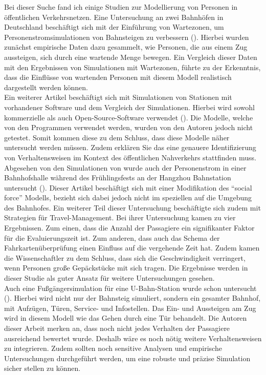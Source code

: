 Bei dieser Suche fand ich einige Studien zur Modellierung von Personen in öffentlichen Verkehrsnetzen.
Eine Untersuchung an zwei Bahnhöfen in Deutschland beschäftigt sich mit der Einführung von Wartezonen, um Personenstromsimulationen von Bahnsteigen zu verbessern (\cite{Davidich.2013}). Hierbei wurden zunächst empirische Daten dazu gesammelt, wie Personen, die aus einem Zug aussteigen, sich durch eine wartende Menge bewegen. Ein Vergleich dieser Daten mit den Ergebnissen von Simulationen mit Wartezonen, führte zu der Erkenntnis, dass die Einflüsse von wartenden Personen mit diesem Modell realistisch dargestellt werden können. \\
Ein weiterer Artikel beschäftigt sich mit Simulationen von Stationen mit vorhandener Software und dem Vergleich der Simulationen. Hierbei wird sowohl kommerzielle als auch Open-Source-Software verwendet (\cite{DubrocaVoisin.2019}). Die Modelle, welche von den Programmen verwendet werden, wurden von den Autoren jedoch nicht getestet. Somit kommen diese zu dem Schluss, dass diese Modelle näher untersucht werden müssen. Zudem erklären Sie das eine genauere Identifizierung von Verhaltensweisen im Kontext des öffentlichen Nahverkehrs stattfinden muss.\\
Abgesehen von den Simulationen von \cite{DubrocaVoisin.2019} wurde auch der Personenstrom in einer Bahnhofshalle während des Frühlingsfests an der Hangzhou Bahnstation untersucht (\cite{Wang.2013}). Dieser Artikel beschäftigt sich mit einer Modifikation des "`social force"' Modells, bezieht sich dabei jedoch nicht im speziellen auf die Umgebung des Bahnhofes. Ein weiterer Teil dieser Untersuchung beschäftigte sich zudem mit Strategien für Travel-Management. Bei ihrer Untersuchung kamen \cite{Wang.2013} zu vier Ergebnissen. Zum einen, dass die Anzahl der Passagiere ein signifikanter Faktor für die Evaluierungszeit ist. Zum anderen, dass auch das Schema der Fahrkartenüberprüfung einen Einfluss auf die vergehende Zeit hat. Zudem kamen die Wissenschaftler zu dem Schluss, dass sich die Geschwindigkeit verringert, wenn Personen große Gepäckstücke mit sich tragen. Die Ergebnisse werden in dieser Studie als guter Ansatz für weitere Untersuchungen gesehen. \\
Auch eine Fußgängersimulation für eine U-Bahn-Station wurde schon untersucht (\cite{Chen.2017}). Hierbei wird nicht nur der Bahnsteig simuliert, sondern ein gesamter Bahnhof, mit Aufzügen, Türen, Service- und Infostellen. Das Ein- und Aussteigen am Zug wird in diesem Modell wie das Gehen durch eine Tür behandelt. Die Autoren dieser Arbeit merken an, dass noch nicht jedes Verhalten der Passagiere ausreichend bewertet wurde. Deshalb wäre es noch nötig weitere Verhaltensweisen zu integrieren. Zudem sollten noch sensitive Analysen und empirische Untersuchungen durchgeführt werden, um eine robuste und präzise Simulation sicher stellen zu können. \\
